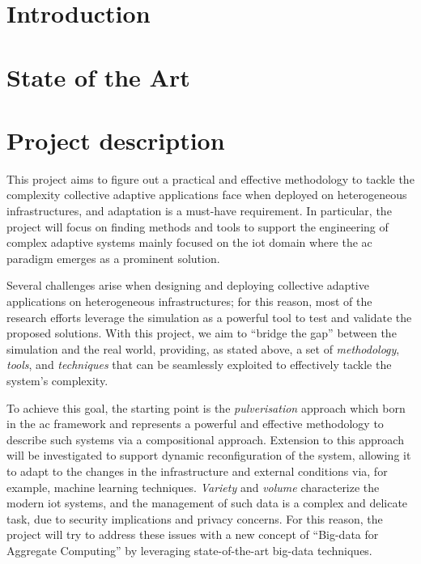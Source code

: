 \documentclass[12pt]{article}
\begin{document}
\section{Introduction}\label{sec:introduction}

\section{State of the Art}\label{sec:state-of-the-art}

\section{Project description}\label{sec:project-description}

This project aims to figure out a practical and effective methodology to tackle the complexity
collective adaptive applications face when deployed on heterogeneous infrastructures,
and adaptation is a must-have requirement.
%
In particular, the project will focus on finding methods and tools to support the
engineering of complex adaptive systems mainly focused on the \ac{iot} domain
where the \ac{ac} paradigm emerges as a prominent solution.

Several challenges arise when designing
and deploying collective adaptive applications on heterogeneous infrastructures;
for this reason, most of the research efforts leverage the simulation
as a powerful tool to test and validate the proposed solutions.
%
With this project, we aim to ``bridge the gap'' between the simulation and the real world,
providing, as stated above, a set of \emph{methodology}, \emph{tools}, and \emph{techniques}
that can be seamlessly exploited to effectively tackle the system's complexity.

To achieve this goal, the starting point is the \emph{pulverisation} approach
which born in the \ac{ac} framework and represents a powerful and effective 
methodology to describe such systems via a compositional approach.
%
Extension to this approach will be investigated to support dynamic reconfiguration
of the system, allowing it to adapt to the changes in the infrastructure and external conditions
via, for example, machine learning techniques.
%
\emph{Variety} and \emph{volume} characterize the modern \ac{iot} systems,
and the management of such data is a complex and delicate task,
due to security implications and privacy concerns.
%
For this reason, the project will try to address these issues with
a new concept of ``Big-data for Aggregate Computing'' by leveraging
state-of-the-art big-data techniques.
\end{document}
